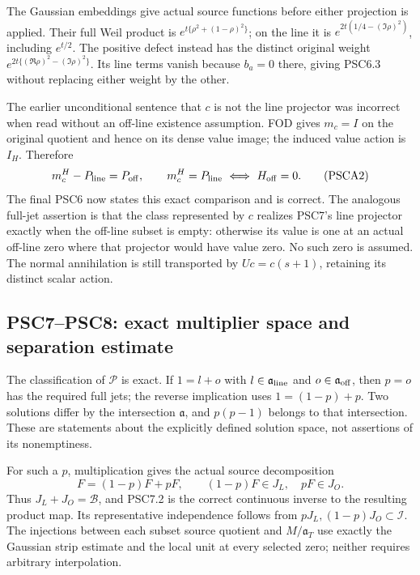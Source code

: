 The Gaussian embeddings give actual source functions before either
projection is applied. Their full Weil product is
\(e^{t\{\rho^2+(1-\rho)^2\}}\); on the line it is
\(e^{2t(1/4-(\Im\rho)^2)}\), including \(e^{t/2}\). The positive defect
instead has the distinct original weight
\(e^{2t\{(\Re\rho)^2-(\Im\rho)^2\}}\). Its line terms vanish because
\(b_a=0\) there, giving PSC6.3 without replacing either weight by the
other.

The earlier unconditional sentence that \(c\) is not the line projector
was incorrect when read without an off-line existence assumption. FOD
gives \(m_c=I\) on the original quotient and hence on its dense value
image; the induced value action is \(I_H\). Therefore \[
m_c^{H}-P_{\rm line}=P_{\rm off},\qquad
m_c^{H}=P_{\rm line}\ \Longleftrightarrow\ H_{\rm off}=0.
\tag{PSCA2}
\] The final PSC6 now states this exact comparison and is correct. The
analogous full-jet assertion is that the class represented by \(c\)
realizes PSC7's line projector exactly when the off-line subset is
empty: otherwise its value is one at an actual off-line zero where that
projector would have value zero. No such zero is assumed. The normal
annihilation is still transported by \(Uc=c(s+1)\), retaining its
distinct scalar action.

\subsection{PSC7--PSC8: exact multiplier space and separation
estimate}\label{psc7psc8-exact-multiplier-space-and-separation-estimate}

The classification of \(\mathscr P\) is exact. If \(1=l+o\) with
\(l\in\mathfrak a_{\rm line}\) and \(o\in\mathfrak a_{\rm off}\), then
\(p=o\) has the required full jets; the reverse implication uses
\(1=(1-p)+p\). Two solutions differ by the intersection \(\mathfrak a\),
and \(p(p-1)\) belongs to that intersection. These are statements about
the explicitly defined solution space, not assertions of its
nonemptiness.

For such a \(p\), multiplication gives the actual source decomposition
\[
F=(1-p)F+pF,\qquad (1-p)F\in J_L,\quad pF\in J_O.
\] Thus \(J_L+J_O=\mathcal B\), and PSC7.2 is the correct continuous
inverse to the resulting product map. Its representative independence
follows from \(pJ_L,(1-p)J_O\subset\mathcal I\). The injections between
each subset source quotient and \(M/\mathfrak a_T\) use exactly the
Gaussian strip estimate and the local unit at every selected zero;
neither requires arbitrary interpolation.

